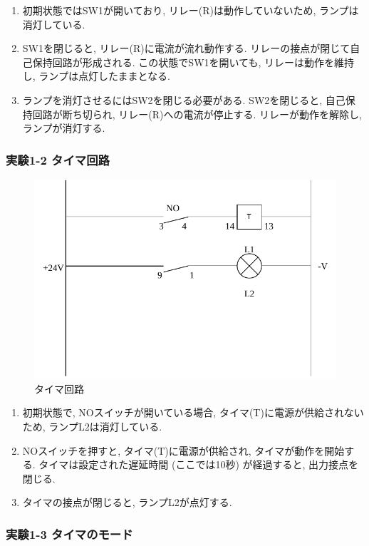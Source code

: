 \begin{enumerate}
  \item 初期状態ではSW1が開いており, リレー(R)は動作していないため, ランプは消灯している.
  \item SW1を閉じると, リレー(R)に電流が流れ動作する. リレーの接点が閉じて自己保持回路が形成される. この状態でSW1を開いても, リレーは動作を維持し, ランプは点灯したままとなる.
  \item ランプを消灯させるにはSW2を閉じる必要がある. SW2を閉じると, 自己保持回路が断ち切られ, リレー(R)への電流が停止する. リレーが動作を解除し, ランプが消灯する.
\end{enumerate}

\subsubsection{実験1-2 タイマ回路}

\begin{figure}[H]
  \centering
  \includegraphics[scale=0.5]{sozai/2.pdf}
  \caption{タイマ回路}
\end{figure}

\begin{enumerate}
  \item 初期状態で, NOスイッチが開いている場合, タイマ(T)に電源が供給されないため, ランプL2は消灯している.
  \item NOスイッチを押すと, タイマ(T)に電源が供給され, タイマが動作を開始する. タイマは設定された遅延時間 (ここでは10秒) が経過すると, 出力接点を閉じる.
  \item タイマの接点が閉じると, ランプL2が点灯する.
\end{enumerate}

\subsubsection{実験1-3 タイマのモード}

